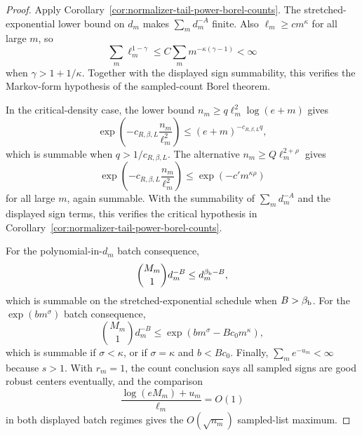 \documentclass[11pt]{amsart}
\numberwithin{equation}{section}
\theoremstyle{definition}
\theoremstyle{remark}
\begin{document}
\begin{proof}
Apply Corollary~\ref{cor:normalizer-tail-power-borel-counts}.  The
stretched-exponential lower bound on \(d_m\) makes \(\sum_m d_m^{-A}\) finite.
Also \(\ell_m\ge c m^\kappa\) for all large \(m\), so
\[
  \sum_m \ell_m^{1-\gamma}
  \le C\sum_m m^{-\kappa(\gamma-1)}<\infty
\]
when \(\gamma>1+1/\kappa\).  Together with the displayed sign summability, this
verifies the Markov-form hypothesis of the sampled-count Borel theorem.

In the critical-density case, the lower bound
\(n_m\ge q\ell_m^2\log(e+m)\) gives
\[
  \exp\left(-c_{R,\beta,L}\frac{n_m}{\ell_m^2}\right)
  \le (e+m)^{-c_{R,\beta,L}q},
\]
which is summable when \(q>1/c_{R,\beta,L}\).  The alternative
\(n_m\ge Q\ell_m^{2+\rho}\) gives
\[
  \exp\left(-c_{R,\beta,L}\frac{n_m}{\ell_m^2}\right)
  \le \exp(-c' m^{\kappa\rho})
\]
for all large \(m\), again summable.  With the summability of \(\sum_m d_m^{-A}\)
and the displayed sign terms, this verifies the critical hypothesis in
Corollary~\ref{cor:normalizer-tail-power-borel-counts}.

For the polynomial-in-\(d_m\) batch consequence,
\[
  \binom{M_m}{1}d_m^{-B}\le d_m^{\beta_{\rm b}-B},
\]
which is summable on the stretched-exponential schedule when
\(B>\beta_{\rm b}\).  For the \(\exp(bm^\sigma)\) batch consequence,
\[
  \binom{M_m}{1}d_m^{-B}
  \le \exp\left(bm^\sigma-Bc_0m^\kappa\right),
\]
which is summable if \(\sigma<\kappa\), or if \(\sigma=\kappa\) and
\(b<Bc_0\).  Finally, \(\sum_m e^{-u_m}<\infty\) because \(s>1\).  With
\(r_m=1\), the count conclusion says all sampled signs are good robust centers
eventually, and the comparison
\[
  \frac{\log(eM_m)+u_m}{\ell_m}=O(1)
\]
in both displayed batch regimes gives the \(O(\sqrt{n_m})\) sampled-list maximum.
\end{proof}
\end{document}
